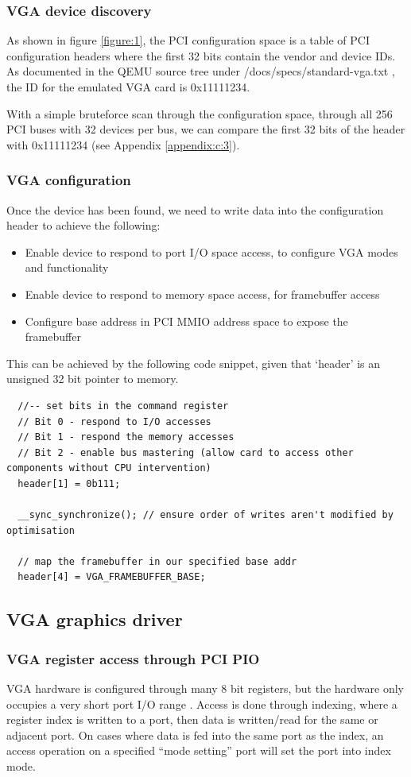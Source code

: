 \subsubsection{VGA device discovery}
As shown in figure \ref{figure:1}, the PCI configuration space is a table of PCI configuration headers
where the first 32 bits contain the vendor and device IDs. As documented in the QEMU source tree under
/docs/specs/standard-vga.txt \cite{qemusource}, the ID for the emulated VGA card is 0x11111234.

With a simple bruteforce scan through the configuration space, through all 256 PCI buses with 32 devices
per bus, we can compare the first 32 bits of the header with 0x11111234 (see Appendix \ref{appendix:c:3}).

\subsubsection{VGA configuration}
Once the device has been found, we need to write data into the configuration header to achieve the following:
\begin{itemize}
    \item Enable device to respond to port I/O space access, to configure VGA modes and functionality
    \item Enable device to respond to memory space access, for framebuffer access
    \item Configure base address in PCI MMIO address space to expose the framebuffer
\end{itemize}
This can be achieved by the following code snippet, given that `header' is an unsigned 32 bit
pointer to memory.
\begin{verbatim}
  //-- set bits in the command register
  // Bit 0 - respond to I/O accesses
  // Bit 1 - respond the memory accesses
  // Bit 2 - enable bus mastering (allow card to access other components without CPU intervention)
  header[1] = 0b111;

  __sync_synchronize(); // ensure order of writes aren't modified by optimisation

  // map the framebuffer in our specified base addr
  header[4] = VGA_FRAMEBUFFER_BASE;
\end{verbatim}

\subsection{VGA graphics driver}
\label{chapter2:impl:driver}
\subsubsection{VGA register access through PCI PIO}
VGA hardware is configured through many 8 bit registers, but the hardware only occupies
a very short port I/O range \cite{osdevvga}. Access is done through indexing, where a register
index is written to a port, then data is written/read for the same or adjacent port. On cases
where data is fed into the same port as the index, an access operation on a specified ``mode setting'' port
will set the port into index mode.

